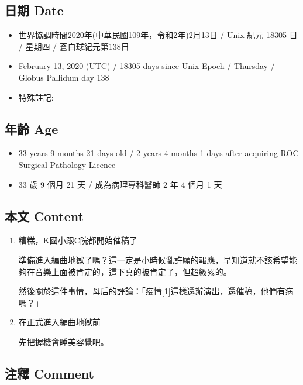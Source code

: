 \documentclass[
]{article}
\providecommand{\tightlist}{%
  \setlength{\itemsep}{0pt}\setlength{\parskip}{0pt}}
\begin{document}
\hypertarget{ux65e5ux671f-date-74}{%
\subsection{日期 Date}\label{ux65e5ux671f-date-74}}

\begin{itemize}
\tightlist
\item
  世界協調時間2020年(中華民國109年，令和2年)2月13日 / Unix 紀元 18305 日
  / 星期四 / 蒼白球紀元第138日
\item
  February 13, 2020 (UTC) / 18305 days since Unix Epoch / Thursday /
  Globus Pallidum day 138
\item
  特殊註記:
\end{itemize}

\hypertarget{ux5e74ux9f61-age-74}{%
\subsection{年齡 Age}\label{ux5e74ux9f61-age-74}}

\begin{itemize}
\tightlist
\item
  33 years 9 months 21 days old / 2 years 4 months 1 days after
  acquiring ROC Surgical Pathology Licence
\item
  33 歲 9 個月 21 天 / 成為病理專科醫師 2 年 4 個月 1 天
\end{itemize}

\hypertarget{ux672cux6587-content-74}{%
\subsection{本文 Content}\label{ux672cux6587-content-74}}

\begin{enumerate}
\def\labelenumi{\arabic{enumi}.}
\item
  糟糕，K國小跟C院都開始催稿了

  準備進入編曲地獄了嗎？這一定是小時候亂許願的報應，早知道就不該希望能夠在音樂上面被肯定的，這下真的被肯定了，但超級累的。

  然後關於這件事情，母后的評論：「疫情{[}1{]}這樣還辦演出，還催稿，他們有病嗎？」
\item
  在正式進入編曲地獄前

  先把握機會睡美容覺吧。
\end{enumerate}

\hypertarget{ux6ce8ux91cb-comment-73}{%
\subsection{注釋 Comment}\label{ux6ce8ux91cb-comment-73}}
\end{document}
